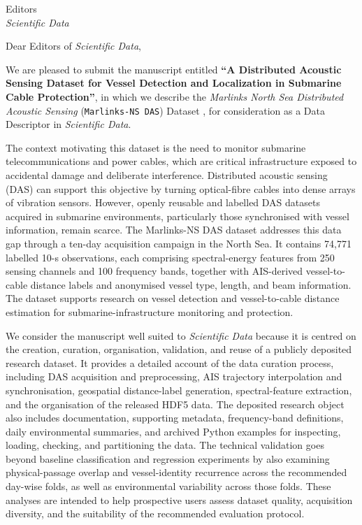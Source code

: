 \documentclass[11pt]{letter}
\date{\today}
\begin{document}
\begin{letter}{Editors\\\textit{Scientific Data}}

\opening{Dear Editors of \textit{Scientific Data},}

We are pleased to submit the manuscript entitled
\textbf{``A Distributed Acoustic Sensing Dataset for Vessel Detection and
Localization in Submarine Cable Protection''}, in which we describe the
\textit{Marlinks North Sea Distributed Acoustic Sensing} (\texttt{Marlinks-NS DAS}) Dataset , for
consideration as a Data Descriptor in \textit{Scientific Data}.

The context motivating this dataset is the need to monitor submarine
telecommunications and power cables, which are critical infrastructure exposed
to accidental damage and deliberate interference. Distributed acoustic sensing
(DAS) can support this objective by turning optical-fibre cables into dense
arrays of vibration sensors. However, openly reusable and labelled DAS datasets
acquired in submarine environments, particularly those synchronised with vessel
information, remain scarce. The Marlinks-NS DAS dataset addresses this data gap
through a ten-day acquisition campaign in the North Sea. It contains 74,771
labelled 10-s observations, each comprising spectral-energy features from 250
sensing channels and 100 frequency bands, together with AIS-derived
vessel-to-cable distance labels and anonymised vessel type, length, and beam
information. The dataset supports research on vessel detection and
vessel-to-cable distance estimation for submarine-infrastructure monitoring and
protection.

We consider the manuscript well suited to \textit{Scientific Data} because it
is centred on the creation, curation, organisation, validation, and reuse of a
publicly deposited research dataset. It provides a detailed account of the data
curation process, including DAS acquisition and preprocessing, AIS trajectory
interpolation and synchronisation, geospatial distance-label generation,
spectral-feature extraction, and the organisation of the released HDF5 data.
The deposited research object also includes documentation, supporting metadata,
frequency-band definitions, daily environmental summaries, and archived Python
examples for inspecting, loading, checking, and partitioning the data. The
technical validation goes beyond baseline classification and regression
experiments by also examining physical-passage overlap and vessel-identity
recurrence across the recommended day-wise folds, as well as environmental
variability across those folds. These analyses are intended to help prospective
users assess dataset quality, acquisition diversity, and the suitability of the
recommended evaluation protocol.


\end{letter}
\end{document}
